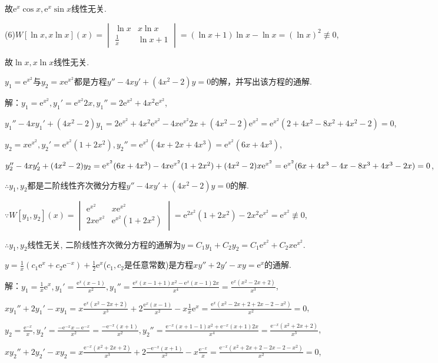 \documentclass[12pt,UTF8,fleqn]{ctexart}
\newcommand{\me}[0]{\mathrm e}
\begin{document}
\begin{enumerate}
故$\me^x\cos x,\me^x\sin x$线性无关.

(6)$W[\ln x,x\ln x](x)=\begin{vmatrix}\ln x&x\ln x\\ \frac1x&\ln x+1\end{vmatrix}=(\ln x+1)\ln x-\ln x=(\ln x)^2\not\equiv0$,

故$\ln x,x\ln x$线性无关.

$y_1=\me^{x^2}$与$y_2=x\me^{x^2}$都是方程$y''-4xy'+(4x^2-2)y=0$的解，并写出该方程的通解.

解：$y_1=\me^{x^2},y_1'=\me^{x^2}2x,y_1''=2\me^{x^2}+4x^2\me^{x^2}$,

$y_1''-4xy_1'+(4x^2-2)y_1=2\me^{x^2}+4x^2\me^{x^2}-4x\me^{x^2}2x+(4x^2-2)\me^{x^2}=\me^{x^2}(2+4x^2-8x^2+4x^2-2)=0$,

$y_2=x\me^{x^2},y_2'=\me^{x^2}(1+2x^2),y_2''=\me^{x^2}(4x+2x+4x^3)=\me^{x^2}(6x+4x^3)$,

$y_2''-4xy_2'+(4x^2-2)y_2=\me^{x^2}(6x+4x^3)-4x\me^{x^2}(1+2x^2)+(4x^2-2)x\me^{x^2}\\
=\me^{x^2}(6x+4x^3-4x-8x^3+4x^3-2x)=0$,

$\therefore y_1,y_2$都是二阶线性齐次微分方程$y''-4xy'+(4x^2-2)y=0$的解.

$\because W[y_1,y_2](x)=\begin{vmatrix}\me^{x^2}&x\me^{x^2}\\2x\me^{x^2}&\me^{x^2}(1+2x^2)\end{vmatrix}=\me^{2x^2}(1+2x^2)-2x^2\me^{x^2}=\me^{x^2}\not\equiv0$,

$\therefore y_1,y_2$线性无关, 二阶线性齐次微分方程的通解为$y=C_1y_1+C_2y_2=C_1\me^{x^2}+C_2x\me^{x^2}$.

$y=\frac1x(c_1\me^x+c_2\me^{-x})+\frac12\me^x$($c_1,c_2$是任意常数)是方程$xy''+2y'-xy=\me^x$的通解.

解：$y_1=\frac1x\me^x,y_1'=\frac{\me^x(x-1)}{x^2},y_1''=\frac{\me^x(x-1+1)x^2-\me^x(x-1)2x}{x^4}=\frac{\me^x(x^2-2x+2)}{x^3}$,

$xy_1''+2y_1'-xy_1=x\frac{\me^x(x^2-2x+2)}{x^3}+2\frac{\me^x(x-1)}{x^2}-x\frac1x\me^x=\frac{\me^x(x^2-2x+2+2x-2-x^2)}{x^2}=0$,

$y_2=\frac{\me^{-x}}x,y_2'=\frac{-\me^{-x}x-\me^{-x}}{x^2}=\frac{-\me^{-x}(x+1)}{x^2},y_2''=\frac{\me^{-x}(x+1-1)x^2+\me^{-x}(x+1)2x}{x^4}=\frac{\me^{-x}(x^2+2x+2)}{x^3}$,

$xy_2''+2y_2'-xy_2=x\frac{\me^{-x}(x^2+2x+2)}{x^3}+2\frac{-\me^{-x}(x+1)}{x^2}-x\frac{\me^{-x}}x=\frac{\me^{-x}(x^2+2x+2-2x-2-x^2)}{x^2}=0$,


\end{enumerate}
\end{document}
